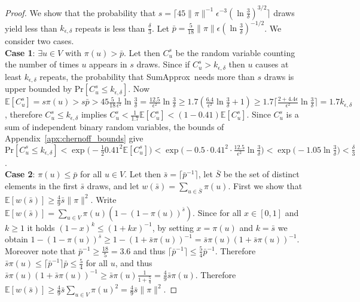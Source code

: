 \documentclass[a4paper,11pt]{article}
\newcommand{\E}{\mathbb{E}}
\newcommand{\prob}{\text{Pr}}
\newcommand{\sumest}{SumApprox}
\newcommand{\kerr}{k_{\epsilon,\delta}}
\begin{document}
\begin{proof}
\label{apx:proof_sumest_cost}
\newcommand{\myb}{c}
\newcommand{\mybb}{\frac{5}{18}}
\newcommand{\mys}{s}
\newcommand{\myss}{\bar{s}}
\newcommand{\mySS}{\bar{S}}
We show that the probability that $\mys = \lceil 45 \|\pi\|^{-1} \epsilon^{-3}(\ln{\frac{3}{\delta}})^{3/2} \rceil$ draws yield less than $\kerr$ repeats is less than $\frac{\delta}{3}$.
Let $\bar{p} = \mybb\|\pi\| \epsilon (\ln{\frac{3}{\delta}})^{-1/2}$.
We consider two cases.
\\\textbf{Case 1}: $\exists u \in V$ with $\pi(u) > \bar{p}$.
Let then $C_u^s$ be the random variable counting the number of times $u$ appears in $\mys$ draws.
Since if $C_u^s > \kerr$ then $u$ causes at least $\kerr$ repeats, the probability that \sumest\ needs more than $s$ draws is upper bounded by $\prob[C_u^s \le \kerr]$.
Now $\E[C_u^s] = \mys \pi(u) > \mys \bar{p} >  45\mybb \frac{1}{\epsilon^2}\ln{\frac{3}{\delta}} = \frac{12.5}{\epsilon^2}\ln{\frac{3}{\delta}} \ge 1.7 (\frac{6.4}{\epsilon^2}\ln{\frac{3}{\delta}} +1) \ge 1.7 \lceil \frac{2 + 4.4\epsilon}{\epsilon^2} \ln{\frac{3}{\delta}} \rceil = 1.7 \kerr$, therefore
$C_u^s \le \kerr$ implies $C_u^s < \frac{1}{1.7}\E[C_u^s] < (1 - 0.41)\E[C_u^s]$.
Since $C_u^s$ is a sum of independent binary random variables, the bounds of Appendix~\ref{apx:chernoff_bounds} give $\prob[C_u^s \le \kerr] < \exp{\!\big(\!-\!\frac{1}{2} 0.41^2 \E[C_u^s] \big)} < \exp{\!\big(\!-0.5 \cdot 0.41^2 \cdot \frac{12.5}{\epsilon^2} \ln\frac{3}{\delta} \big)} < \exp{\!\big(\!-1.05 \ln\frac{3}{\delta} \big)} < \frac{\delta}{3}$.
\\\textbf{Case 2}: $\pi(u) \le \bar{p}$ for all $u \in V$.
Let then $\myss = \lceil \bar{p}^{-1} \rceil$, let $\mySS$ be the set of distinct elements in the first $\myss$ draws, and let $w(\myss) = \sum_{u \in \mySS} \pi(u)$.
First we show that $\E[w(\myss)] \ge \frac{4}{9}\myss\|\pi\|^2$.
Write $\E[w(\myss)] = \sum_{u \in V} \pi(u)(1-(1-\pi(u))^{\myss})$.
Since for all $x \in [0,1]$ and $k \ge 1$ it holds $(1-x)^k \le (1+kx)^{-1}$, by setting $x=\pi(u)$ and $k=\myss$ we obtain $1-(1-\pi(u))^{\myss} \ge 1-(1+\myss\pi(u))^{-1} = \myss\pi(u)(1+\myss\pi(u))^{-1}$.
Moreover note that $\bar{p}^{-1} \ge \frac{18}{5} = 3.6$ and thus $\lceil\bar{p}^{-1}\rceil \le \frac{5}{4}\bar{p}^{-1}$. Therefore $\myss \pi(u) \le \lceil\bar{p}^{-1}\rceil\bar{p} \le \frac{5}{4}$ for all $u$, and thus $\myss\pi(u)(1+\myss\pi(u))^{-1} \ge \myss\pi(u)\frac{1}{1+\frac{5}{4}} = \frac{4}{9}\myss\pi(u)$.
Therefore $\E[w(\myss)] \ge \frac{4}{9} \myss \sum_{u \in V} \pi(u)^2 = \frac{4}{9}\myss\|\pi\|^2$.

\end{proof}
\end{document}
